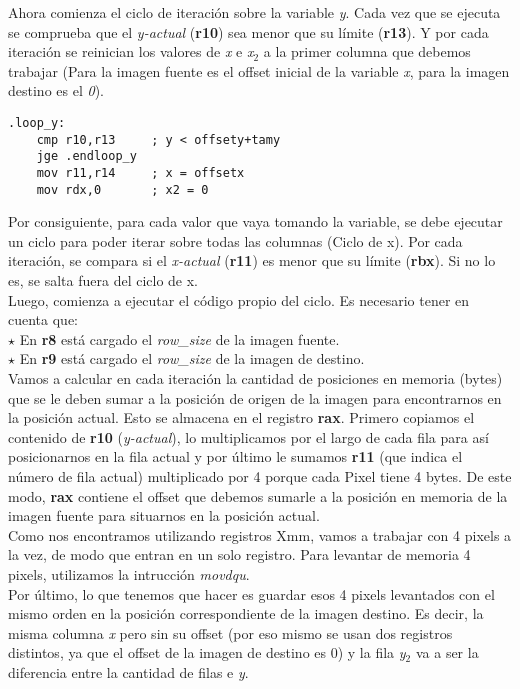 \documentclass[a4paper]{article}
\begin{document}
\indent Ahora comienza el ciclo de iteraci\'on sobre la variable \emph{y}. Cada vez que se ejecuta se comprueba que el \emph{y-actual} (\textbf{r10}) sea menor que su l\'imite (\textbf{r13}). Y por cada iteraci\'on se reinician los valores de \emph{x} e \emph{x$_2$} a la primer columna que debemos trabajar (Para la imagen fuente es el offset inicial de la variable \emph{x}, para la imagen destino es el \emph{0}).
	  \begin{codesnippet}
\begin{verbatim}
.loop_y:
	cmp r10,r13     ; y < offsety+tamy
	jge .endloop_y
	mov r11,r14     ; x = offsetx
	mov rdx,0       ; x2 = 0
\end{verbatim}
\end{codesnippet}

\indent Por consiguiente, para cada valor que vaya tomando la variable, se debe ejecutar un ciclo para poder iterar sobre todas las columnas (Ciclo de x). Por cada iteraci\'on, se compara si el \emph{x-actual} (\textbf{r11}) es menor que su l\'imite (\textbf{rbx}). Si no lo es, se salta fuera del ciclo de x. \\
\indent Luego, comienza a ejecutar el c\'odigo propio del ciclo. Es necesario tener en cuenta que: \\
$\star$ En \textbf{r8} est\'a cargado el \textit{row_size} de la imagen fuente. \\
$\star$ En \textbf{r9} est\'a cargado el \textit{row_size} de la imagen de destino. \\
\indent Vamos a calcular en cada iteraci\'on la cantidad de posiciones en memoria (bytes) que se le deben sumar a la posici\'on de origen de la imagen para encontrarnos en la posici\'on actual. Esto se almacena en el registro \textbf{rax}. Primero copiamos el contenido de \textbf{r10} (\emph{y-actual}), lo multiplicamos por el largo de cada fila para as\'i posicionarnos en la fila actual y por \'ultimo le sumamos \textbf{r11} (que indica el n\'umero de fila actual) multiplicado por 4 porque cada Pixel tiene 4 bytes. De este modo, \textbf{rax} contiene el offset que debemos sumarle a la posici\'on en memoria de la imagen fuente para situarnos en la posici\'on actual.\\
\indent Como nos encontramos utilizando registros Xmm, vamos a trabajar con 4 pixels a la vez, de modo que entran en un solo registro. Para levantar de memoria 4 pixels, utilizamos la intrucci\'on \textit{movdqu}. \\
\indent Por \'ultimo, lo que tenemos que hacer es guardar esos 4 pixels levantados con el mismo orden en la posici\'on correspondiente de la imagen destino. Es decir, la misma columna \emph{x} pero sin su offset (por eso mismo se usan dos registros distintos, ya que el offset de la imagen de destino es 0) y la fila \emph{y$_2$} va a ser la diferencia entre la cantidad de filas e \emph{y}. \\
\end{document}
